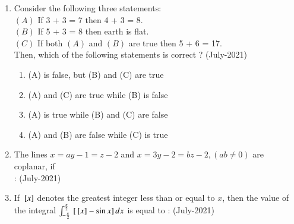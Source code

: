 \documentclass[journal]{IEEEtran}
\begin{document}
\begin{enumerate}
\begin{enumerate}
    \end{enumerate}
    \item Consider the following three statements: \\
    $(A)$ If 3 + 3 = 7 then 4 + 3 = 8. \\ 
    $(B)$ If 5 + 3 = 8 then earth is flat.\\
    $(C)$ If both $(A)$ and $(B)$ are true then 5 + 6 = 17.\\
    Then, which of the following statements is correct ? \hfill (July-2021)
    \begin{enumerate}
        \item (A) is false, but (B) and (C) are true 
        \item (A) and (C) are true while (B) is false
        \item (A) is true while (B) and (C) are false 
        \item (A) and (B) are false while (C) is true
    \end{enumerate}
    \item The lines $x = ay -1 = z 
- 2$ and $x = 3y -
 2 = bz -
 2, (ab \neq  
 0) $ are coplanar, if \\: 
   \hfill (July-2021)
 \begin{enumerate}
 \end{enumerate}
   \item  If ${}\left[x\right]$ denotes the greatest integer less than or equal to $x$, then the value of the integral $\int_{-\frac{\pi}{2}}^{\frac{\pi}{2}} {}\left[{}\left[x\right] - \sin{x}\right]dx$ is equal to : \hfill (July-2021)
    \begin{enumerate}

\end{enumerate}
\end{enumerate}
\end{document}
